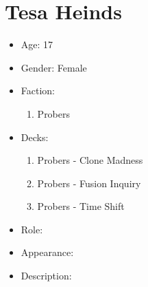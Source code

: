 \section{Tesa Heinds}
    \begin{itemize}
        \item Age: 17
        \item Gender: Female
        \item Faction: 
            \begin{enumerate}
                \item Probers
            \end{enumerate}
        \item Decks: 
            \begin{enumerate}
                \item Probers - Clone Madness 
                \item Probers - Fusion Inquiry
                \item Probers - Time Shift
            \end{enumerate}
        \item Role: 
        \item Appearance: 
        \item Description: 
    \end{itemize}
    \newpage